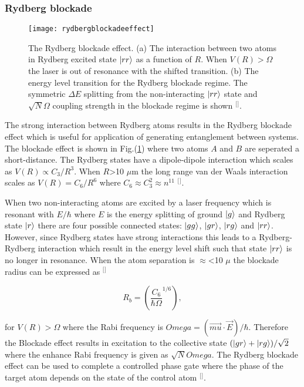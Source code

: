 \subsubsection{Rydberg blockade}
\begin{figure}[t]
\centering
\texttt{[image: rydbergblockadeeffect]}
\caption{\label{fig:rydbergblockadeeffect} The Rydberg blockade effect. (a) The interaction between two atoms in Rydberg excited state $\lvert rr\rangle$ as a function of $R$. When $V(R)>\Omega$ the laser is out of resonance with the shifted transition. (b) The energy level transition for the Rydberg blockade regime. The symmetric $\Delta E$ splitting from the non-interacting $\lvert rr\rangle$ state and $\sqrt{N}\Omega$ coupling strength in the blockade regime is shown $^{[}$\citep{Gaetan2009ObservationRegime}$^{]}$.}
\end{figure}

The strong interaction between Rydberg atoms results in the Rydberg blockade effect which is useful for application of generating entanglement between systems. The blockade effect is shown in Fig.(\ref{fig:rydbergblockadeeffect}) where two atoms $A$ and $B$ are seperated a short-distance. The Rydberg states have a dipole-dipole interaction which scales as $V(R)\propto C_{3}/R^{3}$. When $R$>10 $\mu$m the long range van der Waals interaction scales as $V(R)=C_{6}/R^{6}$ where $C_{6}\approx C_{3}^{2}\approx n^{11}$ $^{[}$\citep{Gaetan2009ObservationRegime,Saffman2010QuantumAtoms}$^{]}$. 

When two non-interacting atoms are excited by a laser frequency which is resonant with $E/\hbar$ where $E$ is the energy splitting of ground $\lvert g\rangle$ and Rydberg state $\lvert r\rangle$ there are four possible connected states: $\lvert gg\rangle$, $\lvert gr\rangle$, $\lvert rg\rangle$ and $\lvert rr\rangle$. However, since Rydberg states have strong interactions this leads to a Rydberg-Rydberg interaction which result in the energy level shift such that state $\lvert rr\rangle$ is no longer in resonance. When the atom separation is $\approx$<10 $\mu$ the blockade radius can be expressed as $^{[}$\citep{Comparat2010DipoleInvited}$^{]}$

\begin{equation}
\label{eq:bindingenergy}
R_{b}=\left ( \frac{C_{6}}{\hbar \Omega}^{1/6} \right ),
\end{equation}

for $V(R)>\Omega$ where the Rabi frequency is $Omega=(\vec{mu} \cdot \vec{E})/\hbar$. Therefore the Blockade effect results in excitation to the collective state $(\lvert gr\rangle+\lvert rg\rangle)/\sqrt{2}$ where the enhance Rabi frequency is given as $\sqrt{N}Omega$. The Rydberg blockade effect can be used to complete a controlled phase gate where the phase of the target atom depends on the state of the control atom $^{[}$\citep{Urban2009ObservationTwoatoms}$^{]}$.  


